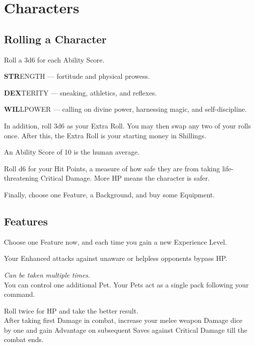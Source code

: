 \documentclass[itdr]{subfiles}
\begin{document}
\chapter{Characters}
\label{ch:characters}
\resetHeaders

\section{Rolling a Character}

Roll a 3d6 for each Ability Score.

\textbf{STR}ENGTH --- fortitude and physical prowess.

\textbf{DEX}TERITY --- sneaking, athletics, and reflexes.

\textbf{WIL}LPOWER --- calling on divine power, harnessing magic, and self-discipline.

In addition, roll 3d6 as your Extra Roll. You may then swap any two of your rolls once. After this, the Extra Roll is your starting money in Shillings.

An Ability Score of 10 is the human average.

Roll d6 for your Hit Points, a measure of how safe they are from taking life-threatening Critical \mbox{Damage}. More HP means the character is safer.

Finally, choose one Feature, a Background, and buy some Equipment.

\section{Features}

Choose one Feature now, and each time you gain a new Experience Level.

\vfill
{}
Your Enhanced attacks against unaware or helpless opponents bypass HP.

\vfill
{} {\slshape Can be taken multiple times.}\\
You can control one additional Pet. Your Pets act as a single pack following your command.

\vfill
{} Roll twice for HP and take the better result.\\
After taking first Damage in combat, increase your melee weapon Damage dice by one and gain Advantage on subsequent Saves against Critical Damage till the combat ends.
\end{document}
